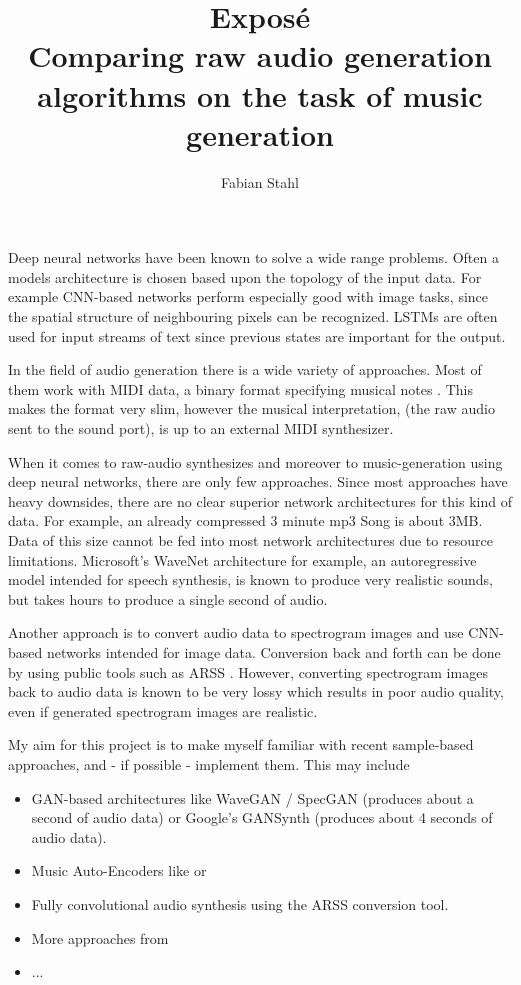 \documentclass[11pt,a4paper]{article}
\title{\huge{Exposé} \\ \vspace{1.0cm} \large{Comparing raw audio generation algorithms on the task of music generation}}
\author{Fabian Stahl}
\begin{document}
\maketitle





Deep neural networks have been known to solve a wide range problems.
Often a models architecture is chosen based upon the topology of the input data.
For example CNN-based networks perform especially good with image tasks, since the spatial structure of neighbouring pixels can be recognized. 
LSTMs are often used for input streams of text since previous states are important for the output.

In the field of audio generation there is a wide variety of approaches.
Most of them work with MIDI data, a binary format specifying musical notes \cite{yang2017midinet, roberts2018hierarchical, tikhonov2017music, hennig2017classifying}.
This makes the format very slim, however the musical interpretation, (the raw audio sent to the sound port), is up to an external MIDI synthesizer.

When it comes to raw-audio synthesizes and moreover to music-generation using deep neural networks, there are only few approaches.
Since most approaches have heavy downsides, there are no clear superior network architectures for this kind of data.
For example, an already compressed 3 minute mp3 Song is about 3MB.
Data of this size cannot be fed into most network architectures due to resource limitations.
Microsoft's WaveNet architecture \cite{van2016wavenet} for example, an autoregressive model intended for speech synthesis, is known to produce very realistic sounds, but takes hours to produce a single second of audio.

Another approach is to convert audio data to spectrogram images and use CNN-based networks intended for image data.
Conversion back and forth can be done by using public tools such as ARSS \cite{arss}.
However, converting spectrogram images back to audio data is known to be very lossy which results in poor audio quality, even if generated spectrogram images are realistic.


My aim for this project is to make myself familiar with recent sample-based approaches, and - if possible - implement them.
This may include 
\begin{itemize}
\item GAN-based architectures like WaveGAN / SpecGAN \cite{donahue2018adversarial} (produces about a second of audio data) or Google's GANSynth \cite{engel2019gansynth}(produces about 4 seconds of audio data).
\item Music Auto-Encoders like \cite{colonel2017improving, sarroff2014musical} or \cite{roberts2017hierarchical}
\item Fully convolutional audio synthesis using the ARSS conversion tool.
\item More approaches from \cite{briot2017deep}
\item ...
\end{itemize}
\end{document}
